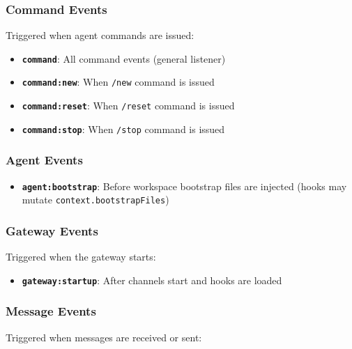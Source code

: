 \subsubsection{Command Events}


Triggered when agent commands are issued:

\begin{itemize}
  \item \textbf{\texttt{command}}: All command events (general listener)
  \item \textbf{\texttt{command:new}}: When \texttt{/new} command is issued
  \item \textbf{\texttt{command:reset}}: When \texttt{/reset} command is issued
  \item \textbf{\texttt{command:stop}}: When \texttt{/stop} command is issued
\end{itemize}


\subsubsection{Agent Events}


\begin{itemize}
  \item \textbf{\texttt{agent:bootstrap}}: Before workspace bootstrap files are injected (hooks may mutate \texttt{context.bootstrapFiles})
\end{itemize}


\subsubsection{Gateway Events}


Triggered when the gateway starts:

\begin{itemize}
  \item \textbf{\texttt{gateway:startup}}: After channels start and hooks are loaded
\end{itemize}


\subsubsection{Message Events}


Triggered when messages are received or sent:


